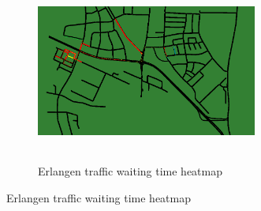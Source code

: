 \begin{figure}[t]
\centering
	\begin{subfigure}[t]{1\textwidth}
	\centering
	\includegraphics[width=0.8\textwidth,height=6cm]{img/Erlangen/Erlangen}
	\caption{Erlangen traffic waiting time heatmap}
	\label{fig:Erlangen_waiting}
	\end{subfigure}
	

\end{figure}
